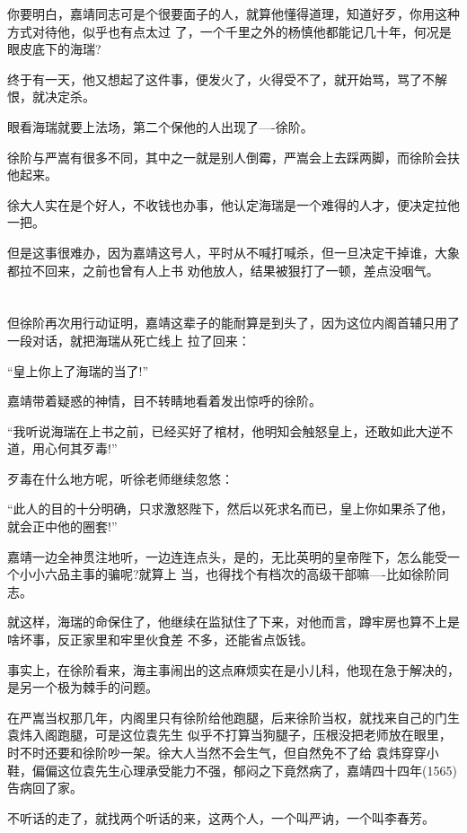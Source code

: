 \documentclass[11pt,a4paper,onecolumn]{article}
\begin{document}
你要明白，嘉靖同志可是个很要面子的人，就算他懂得道理，知道好歹，你用这种方式对待他，似乎也有点太过
了，一个千里之外的杨慎他都能记几十年，何况是眼皮底下的海瑞?

终于有一天，他又想起了这件事，便发火了，火得受不了，就开始骂，骂了不解恨，就决定杀。

眼看海瑞就要上法场，第二个保他的人出现了----徐阶。

徐阶与严嵩有很多不同，其中之一就是别人倒霉，严嵩会上去踩两脚，而徐阶会扶他起来。

徐大人实在是个好人，不收钱也办事，他认定海瑞是一个难得的人才，便决定拉他一把。

但是这事很难办，因为嘉靖这号人，平时从不喊打喊杀，但一旦决定干掉谁，大象都拉不回来，之前也曾有人上书
劝他放人，结果被狠打了一顿，差点没咽气。

\section[\thesection]{}

但徐阶再次用行动证明，嘉靖这辈子的能耐算是到头了，因为这位内阁首辅只用了一段对话，就把海瑞从死亡线上
拉了回来：

``皇上你上了海瑞的当了!''

嘉靖带着疑惑的神情，目不转睛地看着发出惊呼的徐阶。

``我听说海瑞在上书之前，已经买好了棺材，他明知会触怒皇上，还敢如此大逆不道，用心何其歹毒!''

歹毒在什么地方呢，听徐老师继续忽悠：

``此人的目的十分明确，只求激怒陛下，然后以死求名而已，皇上你如果杀了他，就会正中他的圈套!''

嘉靖一边全神贯注地听，一边连连点头，是的，无比英明的皇帝陛下，怎么能受一个小小六品主事的骗呢?就算上
当，也得找个有档次的高级干部嘛----比如徐阶同志。

就这样，海瑞的命保住了，他继续在监狱住了下来，对他而言，蹲牢房也算不上是啥坏事，反正家里和牢里伙食差
不多，还能省点饭钱。

事实上，在徐阶看来，海主事闹出的这点麻烦实在是小儿科，他现在急于解决的，是另一个极为棘手的问题。

在严嵩当权那几年，内阁里只有徐阶给他跑腿，后来徐阶当权，就找来自己的门生袁炜入阁跑腿，可是这位袁先生
似乎不打算当狗腿子，压根没把老师放在眼里，时不时还要和徐阶吵一架。徐大人当然不会生气，但自然免不了给
袁炜穿穿小鞋，偏偏这位袁先生心理承受能力不强，郁闷之下竟然病了，嘉靖四十四年(1565)告病回了家。

不听话的走了，就找两个听话的来，这两个人，一个叫严讷，一个叫李春芳。
\end{document}
